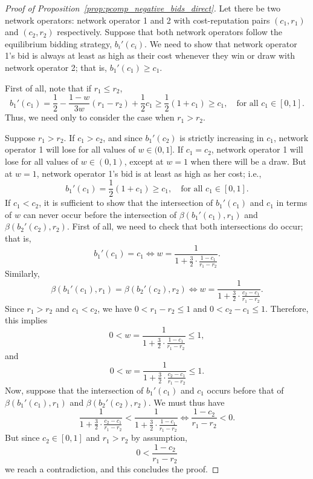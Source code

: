 \begin{proof}[Proof of Proposition~\ref{prop:pcomp_negative_bids_direct}]
Let there be two network operators: network operator 1 and 2 with cost-reputation pairs $(c_1,r_1)$ and $(c_2,r_2)$ respectively. Suppose that both network operators follow the equilibrium bidding strategy, $b_i'(c_i)$. We need to show that network operator 1's bid is always at least as high as their cost whenever they win or draw with network operator 2; that is, $b_1'(c_1)\ge c_1$.

First of all, note that if $r_1\le r_2$,
\begin{equation*}
	b_1'(c_1) = \frac{1}{2}-\frac{1-w}{3w}(r_1-r_2) + \frac{1}{2}c_1 \ge \frac{1}{2}(1+c_1) \ge c_1, \quad\text{for all } c_1\in[0,1].
\end{equation*}
Thus, we need only to consider the case when $r_1>r_2$.

Suppose $r_1>r_2$. If $c_1>c_2$, and since $b_1'(c_2)$ is strictly increasing in $c_1$, network operator 1 will lose for all values of $w\in(0,1]$. If $c_1=c_2$, network operator 1 will lose for all values of $w\in(0,1)$, except at $w=1$ when there will be a draw. But at $w=1$, network operator 1's bid is at least as high as her cost; i.e.,
\begin{equation*}
	b_1'(c_1) = \frac{1}{2}(1+c_1) \ge c_1, \quad\text{for all } c_1\in[0,1].
\end{equation*}
If $c_1<c_2$, it is sufficient to show that the intersection of $b_1'(c_1)$ and $c_1$ in terms of $w$ can never occur before the intersection of $\beta(b_1'(c_1),r_1)$ and $\beta(b_2'(c_2),r_2)$. First of all, we need to check that both intersections do occur; that is,
\begin{equation*}
	b_1'(c_1) = c_1 \iff w = \frac{1}{1 + \frac{3}{2}\cdot\frac{1 - c_1}{r_1 - r_2}}.
\end{equation*}
Similarly,
\begin{equation*}
	\beta(b_1'(c_1),r_1) = \beta(b_2'(c_2),r_2) \iff w = \frac{1}{1+ \frac{3}{2}\cdot\frac{c_2-c_1}{r_1-r_2}}.
\end{equation*}
Since $r_1>r_2$ and $c_1<c_2$, we have $0<r_1-r_2\le 1$ and $0<c_2-c_1\le 1$. Therefore, this implies
\begin{equation*}
	0 < w = \frac{1}{1+ \frac{3}{2}\cdot\frac{1-c_1}{r_1-r_2}} \le 1,
\end{equation*}
and
\begin{equation*}
	0 < w = \frac{1}{1+ \frac{3}{2}\cdot\frac{c_2-c_1}{r_1-r_2}} \le 1.
\end{equation*}
Now, suppose that the intersection of $b_1'(c_1)$ and $c_1$ occurs before that of $\beta(b_1'(c_1),r_1)$ and $\beta(b_2'(c_2),r_2)$. We must thus have
\begin{equation*}
	\frac{1}{1+\frac{3}{2}\cdot\frac{c_2-c_1}{r_1-r_2}} < \frac{1}{1+\frac{3}{2}\cdot\frac{1-c_1}{r_1-r_2}} \iff \frac{1-c_2}{r_1-r_2} < 0.
\end{equation*}
But since $c_2\in[0,1]$ and $r_1>r_2$ by assumption,
\begin{equation*}
	0 < \frac{1-c_2}{r_1-r_2}
\end{equation*}
we reach a contradiction, and this concludes the proof.
\end{proof}

